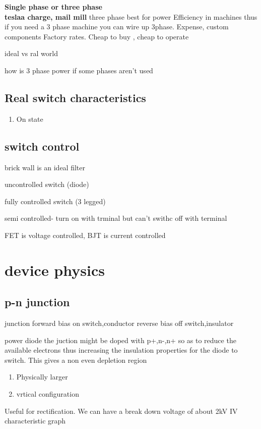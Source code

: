 \documentclass{article}
\begin{document}
     \textbf{Single phase or three phase\\
     teslaa charge, mail mill} three phase best for power Efficiency in machines thus if you need a 3 phase machine you can wire up 3phase.
     Expense, custom components
     Factory rates. Cheap to buy , cheap to operate


     ideal vs ral world

     how is 3 phase power if some phases aren't used

    \subsection{Real switch characteristics}
    \begin{enumerate}
        \item On state 
    \end{enumerate}

    \subsection{switch control}
    brick wall is an ideal filter

    uncontrolled switch (diode)

    fully controlled switch (3 legged)

    semi controlled- turn on with trminal but can't swithc off with terminal

    FET is voltage controlled, BJT is current controlled

    \section{device physics}

    \subsection{p-n junction}
    junction
    forward bias on switch,conductor
    reverse bias off switch,insulator

    power diode
    the juction might be doped with p+,n-,n+ so as to reduce the available electrons thus increasing the insulation properties for the diode to switch. 
    This gives a non even depletion region
    \begin{enumerate}
        \item Physically larger
        \item vrtical configuration
    \end{enumerate}
    Useful for rectification. We can have a break down voltage of about 2kV
    IV characteristic graph
\end{document}
